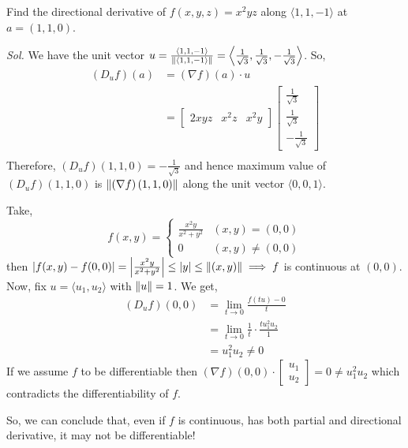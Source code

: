 \documentclass[Analysis-3]{subfiles}
\begin{document}
\begin{Eg}{}{}
  Find the directional derivative of $ f(x,y,z) = x^2yz $ along $ \langle 1,1,-1 \rangle $ at $ a = (1,1,0) $.

  \textit{Sol.} We have the unit vector $ u = \frac{\langle 1,1,-1 \rangle}{\norm{\langle 1,1,-1 \rangle}} = \left\langle \frac{1}{\sqrt{3}}, \frac{1}{\sqrt{3}}, -\frac{1}{\sqrt{3}} \right\rangle $. So,
  \begin{align*}
    \left( D_uf \right)(a) & = \left( \nabla f\right)(a)\cdot u                                                                             \\
                           & = \begin{bmatrix} 2xyz & x^2z & x^2y \end{bmatrix}
    \begin{bmatrix} \frac{1}{\sqrt{3}} \\ \frac{1}{\sqrt{3}} \\ -\frac{1}{\sqrt{3}} \end{bmatrix} \\
  \end{align*}
  Therefore, $ \left( D_uf \right)(1,1,0) = -\frac{1}{\sqrt{3}} $ and hence maximum value of $ \left( D_uf \right)(1,1,0) $ is $ \norm{\left( \nabla f\right)(1,1,0)} $ along the unit vector $ \langle 0,0,1 \rangle $.
\end{Eg}

\begin{Eg}{}{}
  Take,
  \[ f(x,y) = \begin{cases}
      \frac{x^2y}{x^2+y^2} & (x,y) = (0,0)     \\
      0                    & (x,y) \not= (0,0)
    \end{cases} \]
  then $ \left| f(x,y) - f(0,0) \right| = \left| \frac{x^2y}{x^2+y^2} \right| \leq |y| \leq \norm{(x,y)} \implies f $ is continuous at $ (0,0) $. Now, fix $ u = \langle u_1, u_2 \rangle $ with $ \norm{u} = 1 $. We get,
  \begin{align*}
    \left( D_uf \right)(0,0) & = \lim_{t\to 0} \frac{f(tu)- 0}{t}                        \\
                             & =\lim_{t\to 0} \frac{1}{t}\cdot\frac{tu_1^2u_2}{1}        \\
                             & = u_1^2u_2 \not= 0 \tag{Because, $ u $ is an unit vector}
  \end{align*}
  If we assume $ f $ to be differentiable then $ \left( \nabla f \right)(0,0) \cdot \begin{bmatrix} u_1 \\ u_2  \end{bmatrix} = 0 \not= u_1^2u_2 $ which contradicts the differentiability of $ f $.
\end{Eg}

So, we can conclude that, even if $ f $ is continuous, has both partial and directional derivative, it may not be differentiable!
\end{document}

